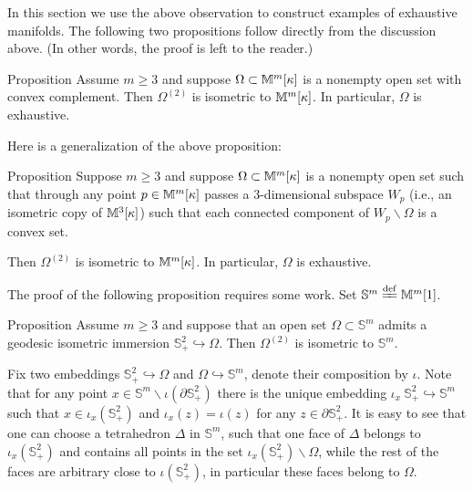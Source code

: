 \documentclass[oneside,a4paper]{article}
\begin{document}
In this section we use the above observation to construct examples of exhaustive manifolds.
The following two propositions follow directly from the discussion above.
(In other words, the proof is left to the reader.)

\begin{thm}{Proposition}\label{prop:comp-conv}
Assume $m\ge 3$ and suppose $\Omega\subset\mathbb{M}^m[\kappa]$ is a nonempty open set with convex complement. Then $\Omega^{(2)}$ is isometric to $\mathbb{M}^m[\kappa]$.
In particular, $\Omega$ is exhaustive.
\end{thm}

Here is a generalization of the above proposition:

\begin{thm}{Proposition}\label{prop:comp-conv+}
Suppose $m\ge 3$ and suppose $\Omega\subset\mathbb{M}^m[\kappa]$ is a nonempty open set such that through any point $p\in \mathbb{M}^m[\kappa]$ passes a $3$-dimensional subspace $W_p$ (i.e., an isometric copy of $\mathbb{M}^3[\kappa]$) such that each connected component of $W_p\backslash\Omega$ is a convex set.

Then $\Omega^{(2)}$ is isometric to $\mathbb{M}^m[\kappa]$.
In particular, $\Omega$ is exhaustive.
\end{thm}

The proof of the following proposition requires some work.
Set $\mathbb S^m\df\MM^m[1]$.


\begin{thm}{Proposition}\label{prop:S-m}
Assume $m\ge 3$ and suppose that an open set 
$\Omega\subset\mathbb S^m$
admits a geodesic isometric immersion $\mathbb S^2_+\hookrightarrow \Omega$.
Then $\Omega^{(2)}$ is isometric to $\mathbb S^m$.
\end{thm}

Fix two embeddings $\mathbb S^2_+\hookrightarrow\Omega$ and $\Omega\hookrightarrow\mathbb S^m$,
denote their composition by $\iota$.
Note that for any point $x\in \mathbb S^m\backslash \iota(\partial\mathbb S^2_+)$
there is the unique embedding $\iota_x\:\mathbb S^2_+\hookrightarrow\mathbb S^m$
such that $x\in \iota_x(\mathbb S^2_+)$
and $\iota_x(z)=\iota(z)$ for any $z\in\partial\mathbb S^2_+$.
It is easy to see that one can choose a tetrahedron $\Delta$ in $\mathbb S^m$, such that one face of
$\Delta$ belongs to $\iota_x(\mathbb S^2_+)$ and contains all points in the set  $\iota_x(\mathbb S^2_+)\backslash\Omega$, while the rest of the faces are arbitrary close to $\iota(\mathbb S^2_+)$, in particular these faces belong to $\Omega$.
\end{document}
